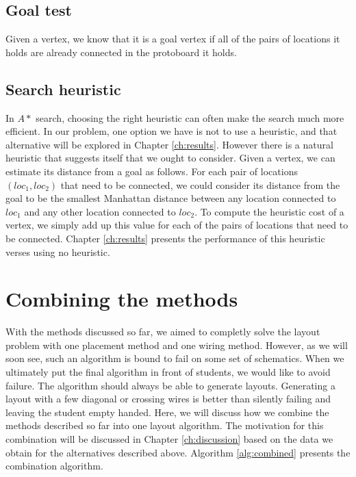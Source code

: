 \subsection{Goal test}

Given a vertex, we know that it is a goal vertex if all of the pairs of
locations it holds are already connected in the protoboard it holds.

\subsection{Search heuristic}

In $A*$ search, choosing the right heuristic can often make the search much more
efficient. In our problem, one option we have is not to use a heuristic, and
that alternative will be explored in Chapter \ref{ch:results}. However there is
a natural heuristic that suggests itself that we ought to consider. Given a
vertex, we can estimate its distance from a goal as follows. For each pair of
locations $(loc_1, loc_2)$ that need to be connected, we could consider its
distance from the
goal to be the smallest Manhattan distance between any location connected to
$loc_1$ and any other location connected to $loc_2$. To compute the heuristic
cost of a vertex, we simply add up this value for each of the pairs of locations
that need to be connected. Chapter \ref{ch:results} presents the performance of
this heuristic verses using no heuristic.

\section{Combining the methods}
\label{sec:combined_alg}

With the methods discussed so far, we aimed to completly solve the layout problem
with one placement method and one wiring method. However, as we will soon see,
such an algorithm is bound to fail on some set of schematics. When we ultimately
put the final algorithm in front of students, we would like to avoid failure.
The algorithm should always be able to generate layouts. Generating a layout
with a few diagonal or crossing wires is better than silently failing and leaving
the student empty handed. Here, we will discuss how we combine the methods
described so far into one layout algorithm. The motivation for this combination
will be discussed in Chapter \ref{ch:discussion} based on the data we obtain
for the alternatives described above. Algorithm \ref{alg:combined} presents the
combination algorithm.

